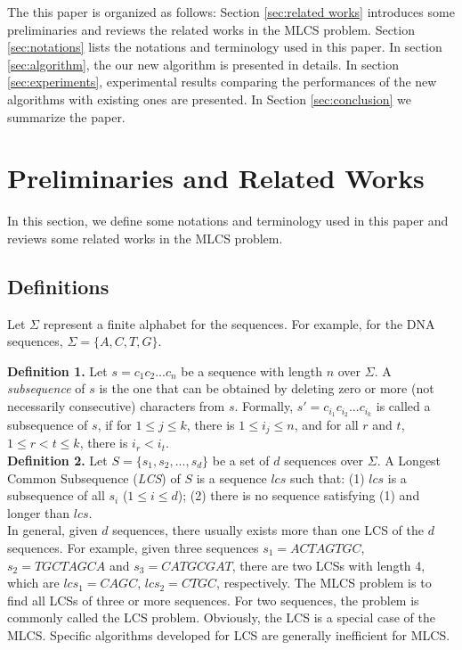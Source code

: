 \documentclass{article}
\begin{document}
The this paper is organized as follows: Section \ref{sec:related
  works} introduces some preliminaries and reviews the related works
in the MLCS problem. Section \ref{sec:notations} lists the notations
and terminology used in this paper. In section \ref{sec:algorithm},
the our new algorithm is presented in details. In section
\ref{sec:experiments}, experimental results comparing the performances
of the new algorithms with existing ones are presented. In Section
\ref{sec:conclusion} we summarize the paper.

\section{Preliminaries and Related Works}
\label{sec:related works}

In this section, we define some notations and terminology used in this
paper and reviews some related works in the MLCS problem.

\subsection{Definitions}
\label{sec:definitions}

Let $\Sigma$ represent a finite alphabet for the sequences.  For
example, for the DNA sequences, $\Sigma=\{A, C, T, G\}$.

\textbf{Definition 1.} Let $s=c_1c_2...c_n$ be a sequence with length
$n$ over $\Sigma$. A \emph{subsequence} of $s$ is the one that can be
obtained by deleting zero or more (not necessarily consecutive)
characters from $s$. Formally, $s'=c_{i_1}c_{i_2}...c_{i_k}$ is called
a subsequence of $s$, if for $1 \leq j \leq k$, there is
$1 \leq i_j \leq n$, and for all $r$ and $t$, $1 \leq r < t \leq k$,
there is $i_r < i_t$.\\

\textbf{Definition 2.} Let $S=\{s_1, s_2, ..., s_d\}$ be a set of $d$
sequences over $\Sigma$. A Longest Common Subsequence (\emph{LCS}) of
$S$ is a sequence $lcs$ such that: (1) $lcs$ is a subsequence of all
$s_i$ ($1 \leq i \leq d$); (2) there is no sequence satisfying (1) and
longer than $lcs$.\\

In general, given $d$ sequences, there usually exists more than one
LCS of the $d$ sequences. For example, given three sequences $s_1 =
ACTAGTGC$, $s_2 = TGCTAGCA$ and $s_3 = CATGCGAT$, there are two LCSs
with length 4, which are $lcs_1 = CAGC$, $lcs_2 = CTGC$,
respectively. The MLCS problem is to find all LCSs of three or more
sequences. For two sequences, the problem is commonly called the LCS
problem. Obviously, the LCS is a special case of the MLCS. Specific
algorithms developed for LCS are generally inefficient for MLCS.\\
\end{document}
